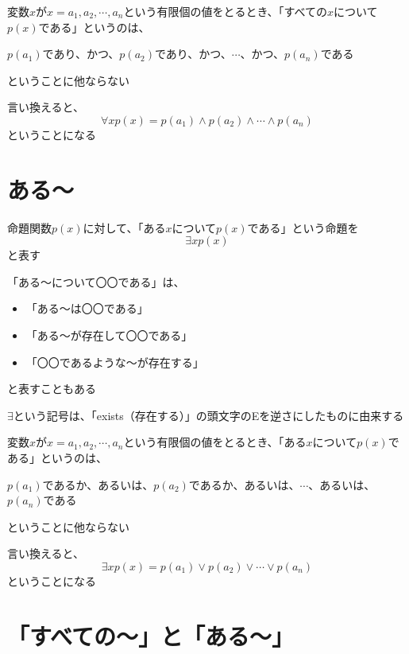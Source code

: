 \documentclass[b5paper,12pt]{jsarticle}
\newcommand{\refbookA}{\refbook{ろんりと集合}}
\begin{document}
\marginnote{\refbookA}

変数$x$が$x= a_1, a_2, \cdots , a_n$という有限個の値をとるとき、「すべての$x$について$p(x)$である」というのは、
\begin{shaded}
  $p(a_1)$であり、かつ、$p(a_2)$であり、かつ、$\cdots$、かつ、$p(a_n)$である
\end{shaded}
ということに他ならない

言い換えると、
\begin{equation*}
  \forall x p(x) = p(a_1) \land p(a_2) \land \cdots \land p(a_n)
\end{equation*}
ということになる

\sectionline
\section{ある〜}

命題関数$p(x)$に対して、「ある$x$について$p(x)$である」という命題を
\begin{equation*}
  \exists x p(x)
\end{equation*}
と表す

\br

「ある〜について〇〇である」は、
\begin{itemize}
  \item 「ある〜は〇〇である」
  \item 「ある〜が存在して〇〇である」
  \item 「〇〇であるような〜が存在する」
\end{itemize}
と表すこともある

\br

$\exists$という記号は、「exists（存在する）」の頭文字のEを逆さにしたものに由来する

\sectionline

変数$x$が$x= a_1, a_2, \cdots , a_n$という有限個の値をとるとき、「ある$x$について$p(x)$である」というのは、
\begin{shaded}
  $p(a_1)$であるか、あるいは、$p(a_2)$であるか、あるいは、$\cdots$、あるいは、$p(a_n)$である
\end{shaded}
ということに他ならない

言い換えると、
\begin{equation*}
  \exists x p(x) = p(a_1) \lor p(a_2) \lor \cdots \lor p(a_n)
\end{equation*}
ということになる

\sectionline
\section{「すべての〜」と「ある〜」}
\end{document}
